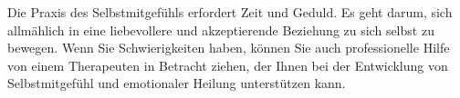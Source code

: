Die Praxis des Selbstmitgefühls erfordert Zeit und Geduld. Es geht darum, sich allmählich in eine liebevollere und akzeptierende Beziehung zu sich selbst zu bewegen. Wenn Sie Schwierigkeiten haben, können Sie auch professionelle Hilfe von einem Therapeuten in Betracht ziehen, der Ihnen bei der Entwicklung von Selbstmitgefühl und emotionaler Heilung unterstützen kann.



